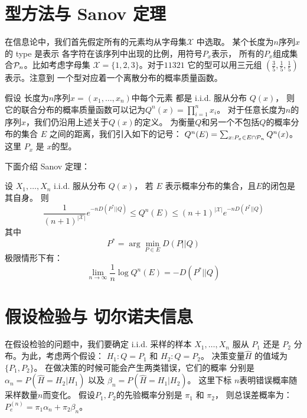 \section{型方法与 Sanov 定理}
在信息论中，我们首先假定所有的元素均从字母集$\mathcal{X}$
中选取。
某个长度为$n$序列$x$的 \gls{type} 是表示
各字符在该序列中出现的比例，用符号$P_x$表示，
所有的$P_x$组成集合$\P_n$。比如考虑字母集
$\mathcal{X}=\{1,2,3\}$。对于$11321$
它的型可以用三元组 $(\frac{3}{5}, 
\frac{1}{5}, \frac{1}{5})$ 表示。注意到
一个型对应着一个离散分布的概率质量函数。

假设 长度为$n$序列$x=(x_1,\dots, x_n)$中每个元素 都是 i.i.d. 服从分布 $Q(x)$，
则它的联合分布的概率质量函数可以记为$Q^n(x)=\prod_{i=1}^n x_i$。
对于任意长度为$n$的序列$x$，我们仍沿用上述关于$Q(x)$的定义。
为衡量$Q$和另一个不包括$Q$的概率分布的集合 $E$ 之间的距离，我们引入如下的记号：
$Q^n(E) = \sum_{x: P_x \in E \cap \P_n} Q^n(x)$。
这里 $P_x$ 是 $x$的型。

下面介绍 Sanov 定理：
\begin{theorem}
  设 $X_1, \dots, X_n$ i.i.d. 服从分布 $Q(x)$，
  若 $E$ 表示概率分布的集合，且$E$的闭包是其自身。
  则
  \begin{equation}
  \frac{1}{(n+1)^{|\mathcal{X}|}} e^{-n D(P^*||Q)}
  \leq Q^n(E) \leq (n+1)^{|\mathcal{X}|} e^{-n D(P^*||Q)}
  \end{equation}
  其中
  \begin{equation}
    P^* = \arg\min_{P\in E} D(P||Q)
  \end{equation}
  极限情形下有：
  \begin{equation}
    \lim_{n\to \infty} \frac{1}{n} \log Q^n(E) = -D(P^*||Q)
  \end{equation}
\end{theorem}
\section{假设检验与 切尔诺夫信息}
在假设检验的问题中，我们要确定 i.i.d. 采样的样本
$X_1, \dots, X_n$ 服从
$P_1$ 还是 $P_2$ 分布。为此，考虑两个假设：
$H_1: Q=P_1$ 和 $H_2: Q=P_2$。
决策变量$\widehat{H}$ 的值域为 $\{P_1, P_2\}$。
在做决策的时候可能会产生两类错误，它们的概率
分别是 $\alpha_n=P(\widehat{H}=H_2|H_1)$
以及 $\beta_n=P(\widehat{H}=H_1|H_2)$。
这里下标 $n$表明错误概率随采样数量$n$而变化。
假设$P_1, P_2$的先验概率分别是 $\pi_1$ 和 $\pi_2$，
则总误差概率为：$P_e^{(n)} = \pi_1 \alpha_n
+ \pi_2 \beta_n$。

